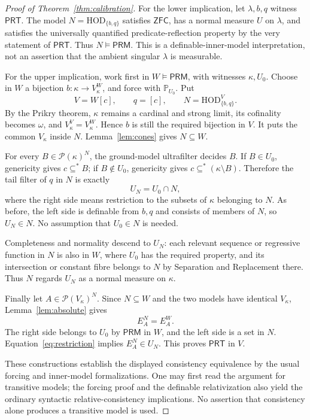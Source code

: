 \documentclass[11pt,letterpaper]{article}
\theoremstyle{definition}
\numberwithin{equation}{section}
\newcommand{\ZFC}{\mathsf{ZFC}}
\newcommand{\HOD}{\mathrm{HOD}}
\newcommand{\Pow}{\mathcal P}
\newcommand{\PP}{\mathbb P}
\newcommand{\PRM}{\mathsf{PRM}}
\newcommand{\PRT}{\mathsf{PRT}}
\newcommand{\substar}{\subseteq^{*}}
\newcommand{\Ncore}{\HOD_{\{b,q\}}}
\begin{document}
\begin{proof}[Proof of Theorem~\ref{thm:calibration}]
For the lower implication, let $\lambda,b,q$ witness $\PRT$. The model $N=\Ncore$ satisfies $\ZFC$, has a normal measure $U$ on $\lambda$, and satisfies the universally quantified predicate-reflection property by the very statement of $\PRT$. Thus $N\models\PRM$. This is a definable-inner-model interpretation, not an assertion that the ambient singular $\lambda$ is measurable.

For the upper implication, work first in $W\models\PRM$, with witnesses $\kappa,U_0$. Choose in $W$ a bijection $b:\kappa\to V_\kappa^W$, and force with $\PP_{U_0}$. Put
\[
 V=W[c],\qquad q=[c],\qquad N=\HOD^V_{\{b,q\}}.
\]
By the Prikry theorem, $\kappa$ remains a cardinal and strong limit, its cofinality becomes $\omega$, and $V_\kappa^V=V_\kappa^W$. Hence $b$ is still the required bijection in $V$. It puts the common $V_\kappa$ inside $N$. Lemma~\ref{lem:cones} gives $N\subseteq W$.

For every $B\in\Pow(\kappa)^N$, the ground-model ultrafilter decides $B$. If $B\in U_0$, genericity gives $c\substar B$; if $B\notin U_0$, genericity gives $c\substar(\kappa\setminus B)$. Therefore the tail filter of $q$ in $N$ is exactly
\begin{equation}\label{eq:restriction}
 U_N=U_0\cap N,
\end{equation}
where the right side means restriction to the subsets of $\kappa$ belonging to $N$. As before, the left side is definable from $b,q$ and consists of members of $N$, so $U_N\in N$. No assumption that $U_0\in N$ is needed.

Completeness and normality descend to $U_N$: each relevant sequence or regressive function in $N$ is also in $W$, where $U_0$ has the required property, and its intersection or constant fibre belongs to $N$ by Separation and Replacement there. Thus $N$ regards $U_N$ as a normal measure on $\kappa$.

Finally let $A\in\Pow(V_\kappa)^N$. Since $N\subseteq W$ and the two models have identical $V_\kappa$, Lemma~\ref{lem:absolute} gives
\[
 E_A^N=E_A^W.
\]
The right side belongs to $U_0$ by $\PRM$ in $W$, and the left side is a set in $N$. Equation~\eqref{eq:restriction} implies $E_A^N\in U_N$. This proves $\PRT$ in $V$.

These constructions establish the displayed consistency equivalence by the usual forcing and inner-model formalizations. One may first read the argument for transitive models; the forcing proof and the definable relativization also yield the ordinary syntactic relative-consistency implications. No assertion that consistency alone produces a transitive model is used.
\end{proof}
\end{document}
